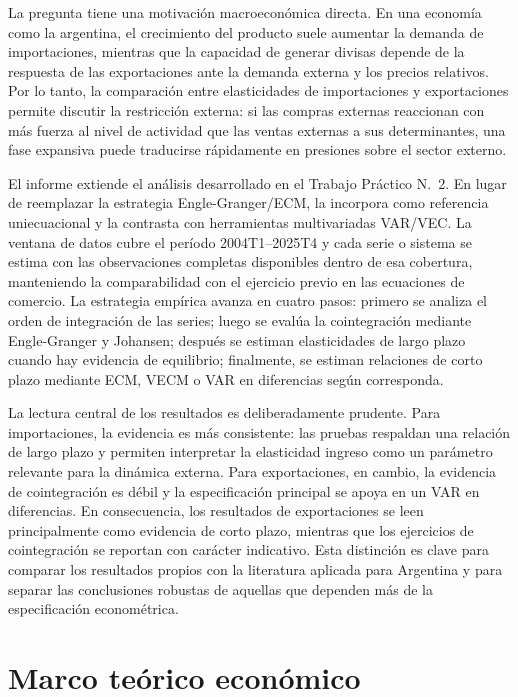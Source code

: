 \documentclass[11pt,a4paper]{article}
\begin{document}
	La pregunta tiene una motivación macroeconómica directa. En una economía como la
	argentina, el crecimiento del producto suele aumentar la demanda de
	importaciones, mientras que la capacidad de generar divisas depende de la
	respuesta de las exportaciones ante la demanda externa y los precios relativos.
	Por lo tanto, la comparación entre elasticidades de importaciones y
	exportaciones permite discutir la restricción externa: si las compras externas
	reaccionan con más fuerza al nivel de actividad que las ventas externas a sus
	determinantes, una fase expansiva puede traducirse rápidamente en presiones
	sobre el sector externo.
	
	El informe extiende el análisis desarrollado en el Trabajo Práctico
	N.\textdegree~2. En lugar de reemplazar la estrategia Engle-Granger/ECM, la
	incorpora como referencia uniecuacional y la contrasta con herramientas
	multivariadas VAR/VEC. La ventana de datos cubre el período 2004T1--2025T4 y
	cada serie o sistema se estima con las observaciones completas disponibles
	dentro de esa cobertura, manteniendo la comparabilidad con el ejercicio previo
	en las ecuaciones de comercio. La estrategia empírica avanza en cuatro pasos:
	primero se analiza el orden de integración de las series; luego se evalúa la
	cointegración mediante Engle-Granger y Johansen; después se estiman
	elasticidades de largo plazo cuando hay evidencia de equilibrio; finalmente, se
	estiman relaciones de corto plazo mediante ECM, VECM o VAR en diferencias según
	corresponda.
	
	La lectura central de los resultados es deliberadamente prudente. Para
	importaciones, la evidencia es más consistente: las pruebas respaldan una
	relación de largo plazo y permiten interpretar la elasticidad ingreso como un
	parámetro relevante para la dinámica externa. Para exportaciones, en cambio, la
	evidencia de cointegración es débil y la especificación principal se apoya en un
	VAR en diferencias. En consecuencia, los resultados de exportaciones se leen
	principalmente como evidencia de corto plazo, mientras que los ejercicios de
	cointegración se reportan con carácter indicativo. Esta distinción es clave para
	comparar los resultados propios con la literatura aplicada para Argentina y para
	separar las conclusiones robustas de aquellas que dependen más de la
	especificación econométrica.
	
	\section{Marco teórico económico}
	\label{sec:marco-teorico}
	
\end{document}
